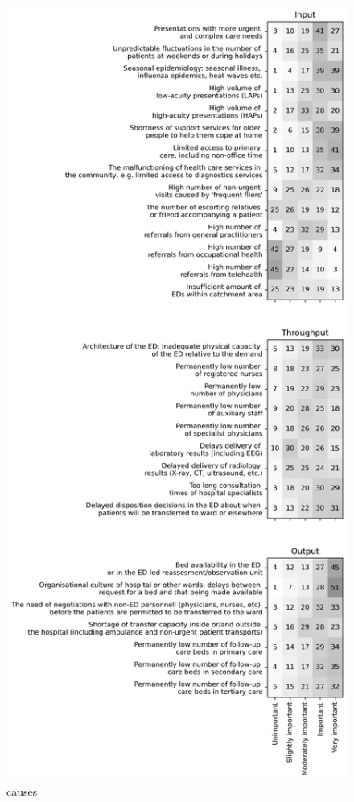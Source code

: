 \documentclass{article}
\begin{document}
\lipsum[4]

\begin{figure}[p]
    \centering
        \includegraphics[height=1.0\textheight]{../output/plots/causes}
        \caption{causes}
        \label{fig:causes}
\end{figure}
\end{document}
